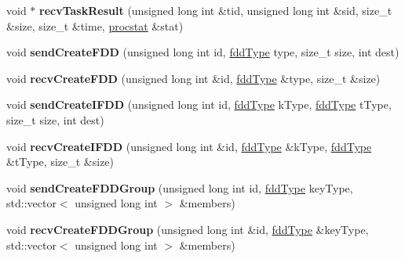 \begin{DoxyCompactItemize}
\item 
\hypertarget{classfaster_1_1fastComm_a41016be2a3623487039d4c40b9762a7c}{}\label{classfaster_1_1fastComm_a41016be2a3623487039d4c40b9762a7c} 
void $\ast$ {\bfseries recv\+Task\+Result} (unsigned long int \&tid, unsigned long int \&sid, size\+\_\+t \&size, size\+\_\+t \&time, \hyperlink{classfaster_1_1procstat}{procstat} \&stat)
\item 
\hypertarget{classfaster_1_1fastComm_aedf068e090c89b62cf23bb060ed98bd8}{}\label{classfaster_1_1fastComm_aedf068e090c89b62cf23bb060ed98bd8} 
void {\bfseries send\+Create\+F\+DD} (unsigned long int id, \hyperlink{namespacefaster_aa8898687bc64536b60a3d5f365060cd6}{fdd\+Type} type, size\+\_\+t size, int dest)
\item 
\hypertarget{classfaster_1_1fastComm_a6335e73103253b835208bbb3b15a318a}{}\label{classfaster_1_1fastComm_a6335e73103253b835208bbb3b15a318a} 
void {\bfseries recv\+Create\+F\+DD} (unsigned long int \&id, \hyperlink{namespacefaster_aa8898687bc64536b60a3d5f365060cd6}{fdd\+Type} \&type, size\+\_\+t \&size)
\item 
\hypertarget{classfaster_1_1fastComm_a1b714530bd2e7c2e0c6a65480bdf5dcf}{}\label{classfaster_1_1fastComm_a1b714530bd2e7c2e0c6a65480bdf5dcf} 
void {\bfseries send\+Create\+I\+F\+DD} (unsigned long int id, \hyperlink{namespacefaster_aa8898687bc64536b60a3d5f365060cd6}{fdd\+Type} k\+Type, \hyperlink{namespacefaster_aa8898687bc64536b60a3d5f365060cd6}{fdd\+Type} t\+Type, size\+\_\+t size, int dest)
\item 
\hypertarget{classfaster_1_1fastComm_a81974b476357e1d465268d58b14de068}{}\label{classfaster_1_1fastComm_a81974b476357e1d465268d58b14de068} 
void {\bfseries recv\+Create\+I\+F\+DD} (unsigned long int \&id, \hyperlink{namespacefaster_aa8898687bc64536b60a3d5f365060cd6}{fdd\+Type} \&k\+Type, \hyperlink{namespacefaster_aa8898687bc64536b60a3d5f365060cd6}{fdd\+Type} \&t\+Type, size\+\_\+t \&size)
\item 
\hypertarget{classfaster_1_1fastComm_a66d4d60b7222f81167428594a26d1138}{}\label{classfaster_1_1fastComm_a66d4d60b7222f81167428594a26d1138} 
void {\bfseries send\+Create\+F\+D\+D\+Group} (unsigned long int id, \hyperlink{namespacefaster_aa8898687bc64536b60a3d5f365060cd6}{fdd\+Type} key\+Type, std\+::vector$<$ unsigned long int $>$ \&members)
\item 
\hypertarget{classfaster_1_1fastComm_a7c04292c7b224a00fbe414e6d22d4bf4}{}\label{classfaster_1_1fastComm_a7c04292c7b224a00fbe414e6d22d4bf4} 
void {\bfseries recv\+Create\+F\+D\+D\+Group} (unsigned long int \&id, \hyperlink{namespacefaster_aa8898687bc64536b60a3d5f365060cd6}{fdd\+Type} \&key\+Type, std\+::vector$<$ unsigned long int $>$ \&members)

\end{DoxyCompactItemize}
